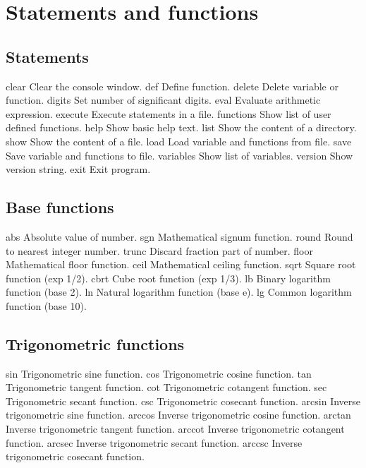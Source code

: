 \hypertarget{command_page_command_sec}{}\section{Statements and functions}\label{command_page_command_sec}
\hypertarget{command_page_command_stat}{}\subsection{Statements}\label{command_page_command_stat}
\begin{DoxyVerb}clear       Clear the console window.
def         Define function.
delete      Delete variable or function.
digits      Set number of significant digits.
eval        Evaluate arithmetic expression.
execute     Execute statements in a file.
functions   Show list of user defined functions.
help        Show basic help text.
list        Show the content of a directory.
show        Show the content of a file.
load        Load variable and functions from file.
save        Save variable and functions to file.
variables   Show list of variables.
version     Show version string.
exit        Exit program.
\end{DoxyVerb}
 \hypertarget{command_page_command_func}{}\subsection{Base functions}\label{command_page_command_func}
\begin{DoxyVerb}abs         Absolute value of number.
sgn         Mathematical signum function.
round       Round to nearest integer number.
trunc       Discard fraction part of number.
floor       Mathematical floor function.
ceil        Mathematical ceiling function.
sqrt        Square root function (exp 1/2).
cbrt        Cube root function (exp 1/3).
lb          Binary logarithm function (base 2).
ln          Natural logarithm function (base e).
lg          Common logarithm function (base 10).
\end{DoxyVerb}
 \hypertarget{command_page_command_trig}{}\subsection{Trigonometric functions}\label{command_page_command_trig}
\begin{DoxyVerb}sin         Trigonometric sine function.
cos         Trigonometric cosine function.
tan         Trigonometric tangent function.
cot         Trigonometric cotangent function.
sec         Trigonometric secant function.
csc         Trigonometric cosecant function.
arcsin      Inverse trigonometric sine function.
arccos      Inverse trigonometric cosine function.
arctan      Inverse trigonometric tangent function.
arccot      Inverse trigonometric cotangent function.
arcsec      Inverse trigonometric secant function.
arccsc      Inverse trigonometric cosecant function.
\end{DoxyVerb}
